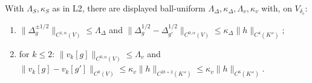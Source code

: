 \begin{lemma}\label{port:lem-vk}
With $\Lambda_S,\kappa_S$ as in L2, there are displayed ball-uniform
$\Lambda_\Delta,\kappa_\Delta,\Lambda_v,\kappa_v$ with, on
$V_{\delta_c}$:
\begin{enumerate}[label=\textup{(\roman*)},leftmargin=*,nosep]
\item $\|\Delta^{\pm1/2}_g\|_{C^{1,\alpha}(V)}\le\Lambda_\Delta$ and
  $\|\Delta^{1/2}_g-\Delta^{1/2}_{g'}\|_{C^{0,\alpha}(V)}
  \le\kappa_\Delta\|h\|_{C^{4}(K'')}$;
\item for $k\le2$: $\|v_k[g]\|_{C^{0,\alpha}(V)}\le\Lambda_v$ and
  $\|v_k[g]-v_k[g']\|_{C^{0}(V)}\le\kappa_v\|h\|_{C^{2k+2}(K'')}
  \le\kappa_v\|h\|_{C^{6}(K'')}$.
\end{enumerate}
\end{lemma}
